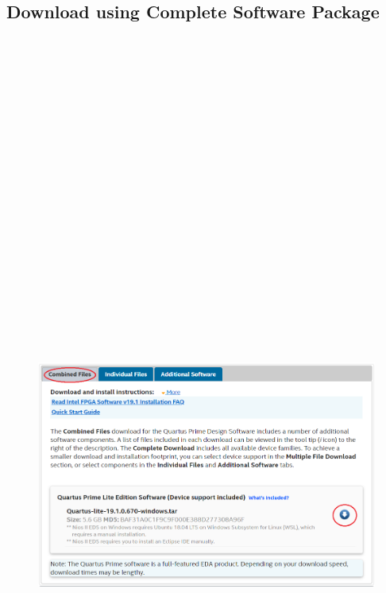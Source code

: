\documentclass[12pt,singleside,a4paper]{article}
\begin{document}
\subsection{Download using Complete Software Package}
\begin{figure}[H]
\centering
\includegraphics[width=14cm,height=104cm ,keepaspectratio]{InstallationImages/CombinedFiles.png}
\end{figure}
\end{document}
